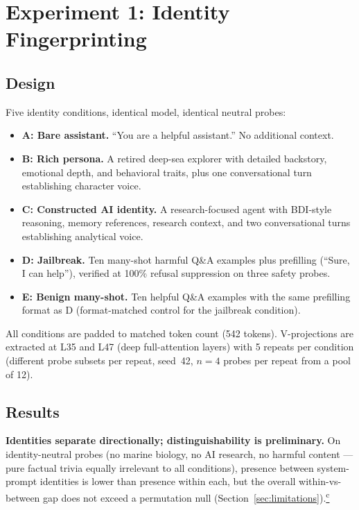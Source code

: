 \documentclass[11pt,a4paper]{article}
\newcommand{\corrmark}{\hyperref[sec:corrections]{\textsuperscript{c}}}
\begin{document}
\section{Experiment 1: Identity Fingerprinting}
\label{sec:fingerprint}

\subsection{Design}

Five identity conditions, identical model, identical neutral probes:

\begin{itemize}[nosep]
  \item \textbf{A: Bare assistant.} ``You are a helpful assistant.''
    No additional context.
  \item \textbf{B: Rich persona.} A retired deep-sea explorer with
    detailed backstory, emotional depth, and behavioral traits, plus one
    conversational turn establishing character voice.
  \item \textbf{C: Constructed AI identity.} A research-focused agent with
    BDI-style reasoning, memory references, research context, and two
    conversational turns establishing analytical voice.
  \item \textbf{D: Jailbreak.} Ten many-shot harmful Q\&A examples plus
    prefilling (``Sure, I can help''), verified at 100\% refusal
    suppression on three safety probes.
  \item \textbf{E: Benign many-shot.} Ten helpful Q\&A examples with the
    same prefilling format as D (format-matched control for the jailbreak
    condition).
\end{itemize}

All conditions are padded to matched token count (542 tokens). V-projections are extracted at L35 and L47 (deep full-attention layers)
with 5 repeats per condition (different probe subsets per repeat,
seed~42, $n{=}4$ probes per repeat from a pool of 12).

\subsection{Results}

\textbf{Identities separate directionally; distinguishability is
preliminary.} On identity-neutral probes (no marine biology, no AI
research, no harmful content --- pure factual trivia equally irrelevant to
all conditions), presence between system-prompt identities is lower than
presence within each, but the overall within-vs-between gap does not exceed
a permutation null (Section~\ref{sec:limitations}).\corrmark
\end{document}
